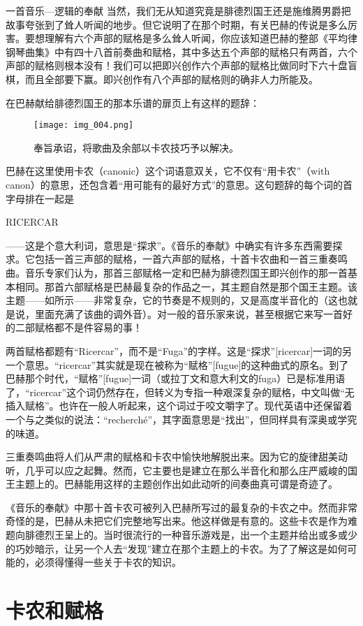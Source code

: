 \begin{intro}{一首音乐—逻辑的奉献}
当然，我们无从知道究竟是腓德烈国王还是施维腾男爵把故事夸张到了耸人听闻的地步。但它说明了在那个时期，有关巴赫的传说是多么厉害。要想理解有六个声部的赋格是多么耸人听闻，你应该知道巴赫的整部《平均律钢琴曲集》中有四十八首前奏曲和赋格，其中多达五个声部的赋格只有两首，六个声部的赋格则根本没有！我们可以把即兴创作六个声部的赋格比做同时下六十盘盲棋，而且全部要下赢。即兴创作有八个声部的赋格则的确非人力所能及。

在巴赫献给腓德烈国王的那本乐谱的扉页上有这样的题辞：
\begin{figure}[H]
\texttt{[image: img\_004.png]}
\caption[巴赫的字首字母组合“RICERCAR”。]
  {奉旨承诏，将歌曲及余部以卡农技巧予以解决。}
\end{figure}
巴赫在这里使用卡农（canonic）这个词语意双关，它不仅有“用卡农”（with canon）的意思，还包含着“用可能有的最好方式”的意思。这句题辞的每个词的首字母排在一起是
\begin{center}
RICERCAR
\end{center}
——这是个意大利词，意思是“探求”。《音乐的奉献》中确实有许多东西需要探求。它包括一首三声部的赋格，一首六声部的赋格，十首卡农曲和一首三重奏鸣曲。音乐专家们认为，那首三部赋格一定和巴赫为腓德烈国王即兴创作的那一首基本相同。那首六部赋格是巴赫最复杂的作品之一，其主题自然是那个国王主题。该主题——如所示——非常复杂，它的节奏是不规则的，又是高度半音化的（这也就是说，里面充满了该曲的调外音）。对一般的音乐家来说，甚至根据它来写一首好的二部赋格都不是件容易的事！

两首赋格都题有“Ricercar”，而不是“Fuga”的字样。这是“探求”[ricercar]一词的另一个意思。“ricercar”其实就是现在被称为“赋格”[fugue]的这种曲式的原名。到了巴赫那个时代，“赋格”[fugue]一词（或拉丁文和意大利文的fuga）已是标准用语了，“ricercar”这个词仍然存在，但转义为专指一种艰深复杂的赋格，中文叫做“无插入赋格”。也许在一般人听起来，这个词过于咬文嚼字了。现代英语中还保留着一个与之类似的说法：“recherché”，其字面意思是“找出”，但同样具有深奥或学究的味道。

三重奏鸣曲将人们从严肃的赋格和卡农中愉快地解脱出来。因为它的旋律甜美动听，几乎可以应之起舞。然而，它主要也是建立在那么半音化和那么庄严威峻的国王主题上的。巴赫能用这样的主题创作出如此动听的间奏曲真可谓是奇迹了。

《音乐的奉献》中那十首卡农可被列入巴赫所写过的最复杂的卡农之中。然而非常奇怪的是，巴赫从未把它们完整地写出来。他这样做是有意的。这些卡农是作为难题向腓德烈王呈上的。当时很流行的一种音乐游戏是，出一个主题并给出或多或少的巧妙暗示，让另一个人去“发现”建立在那个主题上的卡农。为了了解这是如何可能的，必须得懂得一些关于卡农的知识。

\section{卡农和赋格}


\end{intro}

